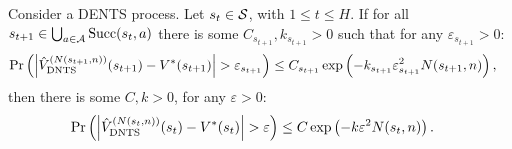         \begin{lemma} \label{lem:dents_val_induction_step}
            Consider a DENTS process. Let $s_t\in\mathcal{S}$, with $1\leq t \leq H$.  If for all $s_{t+1}\in\bigcup_{a\in\mathcal{A}}{\textnormal{Succ}(s_t,a)}$ there is some $C_{s_{t+1}},k_{s_{t+1}}>0$ such that for any $\varepsilon_{s_{t+1}}>0$:
            \begin{align}
                \Pr\left(\left| {\hat{V}^{(N(s_{t+1},n))}_{{\textnormal{DNTS}}}}(s_{t+1}) - V^*(s_{t+1}) \right| > \varepsilon_{s_{t+1}} \right) 
                    &\leq C_{s_{t+1}}\exp\left( -k_{s_{t+1}}\varepsilon_{s_{t+1}}^2 N(s_{t+1},n) \right), 
            \end{align}
            then there is some $C,k>0$, for any $\varepsilon>0$:
            \begin{align}
                \Pr\left(\left| {\hat{V}^{(N(s_{t},n))}_{{\textnormal{DNTS}}}}(s_{t}) - V^*(s_t) \right| > \varepsilon \right) 
                    &\leq C\exp\left( -k\varepsilon^2 N(s_{t},n) \right).
            \end{align}
        \end{lemma}
